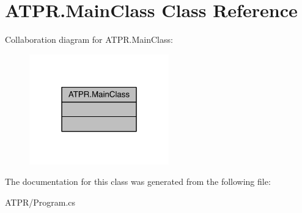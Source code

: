 \hypertarget{class_a_t_p_r_1_1_main_class}{}\section{A\+T\+P\+R.\+Main\+Class Class Reference}
\label{class_a_t_p_r_1_1_main_class}


Collaboration diagram for A\+T\+P\+R.\+Main\+Class\+:\nopagebreak
\begin{figure}[H]
\begin{center}
\leavevmode
\includegraphics[width=171pt]{d8/dbc/class_a_t_p_r_1_1_main_class__coll__graph}
\end{center}
\end{figure}


The documentation for this class was generated from the following file\+:\begin{DoxyCompactItemize}
\item 
A\+T\+P\+R/Program.\+cs\end{DoxyCompactItemize}
